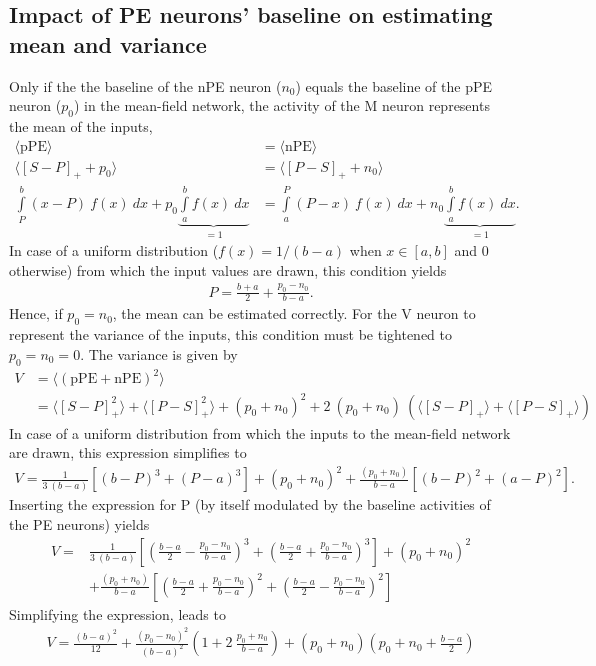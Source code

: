 \documentclass[10pt,a4paper,draft]{article}
\begin{document}
\subsection*{Impact of PE neurons' baseline on estimating mean and variance}
%
Only if the the baseline of the nPE neuron ($n_0$) equals the baseline of the pPE neuron ($p_0$) in the mean-field network, the activity of the M neuron represents the mean of the inputs,
%
\begin{align}
\label{eq:condition_baseline_mean}
\langle \mathrm{pPE} \rangle &= \langle \mathrm{nPE} \rangle \\
\langle \left[ S - P\right]_+ + p_0\rangle &= \langle \left[ P - S\right]_+ + n_0\rangle \nonumber\\
\int\limits_P^b (x - P)\ f(x)\ dx + p_0 \underbrace{\int\limits_a^b f(x)\ dx}_{=1}  &= \int\limits_a^P (P - x)\ f(x)\ dx + n_0 \underbrace{\int\limits_a^b f(x)\ dx}_{=1} . \nonumber
\end{align}
%
In case of a uniform distribution ($f(x) = 1/(b-a)$ when $x\in [a,b]$ and $0$ otherwise) from which the input values are drawn, this condition yields
%
\begin{align}
\label{eq:condition_baseline_mean_1}
P = \frac{b+a}{2} + \frac{p_0 - n_0}{b-a}.
\end{align}
%
Hence, if $p_0 = n_0$, the mean can be estimated correctly. For the V neuron to represent the variance of the inputs, this condition must be tightened to $p_0 = n_0 = 0$. The variance is given by
%
\begin{align}
\label{eq:condition_baseline_variance}
V &= \langle \left( \mathrm{pPE} + \mathrm{nPE} \right)^2 \rangle \\
&= \langle \left[ S-P\right]_+^2\rangle + \langle \left[ P-S\right]_+^2\rangle + (p_0 + n_0)^2 + 2\ (p_0 + n_0)\ \left( \langle \left[ S-P\right]_+\rangle + \langle \left[ P-S\right]_+ \rangle\right) \nonumber
\end{align}
%
In case of a uniform distribution from which the inputs to the mean-field network are drawn, this expression simplifies to
%
\begin{align}
\label{eq:condition_baseline_variance_1}
V = \frac{1}{3\ (b-a)} \left[ (b-P)^3 + (P-a)^3\right] + (p_0 + n_0)^2 + \frac{(p_0 + n_0)}{b-a} \left[ (b-P)^2 + (a-P)^2\right].
\end{align}
%
Inserting the expression for P (by itself modulated by the baseline activities of the PE neurons) yields
%
\begin{align}
V =& \frac{1}{3\ (b-a)} \left[ \left( \frac{b-a}{2} - \frac{p_0 - n_0}{b-a}\right)^3 + \left( \frac{b-a}{2} + \frac{p_0-n_0}{b-a}\right)^3\right] + (p_0 + n_0)^2 \nonumber \\
&+ \frac{(p_0 + n_0)}{b-a} \left[ \left( \frac{b-a}{2} + \frac{p_0-n_0}{b-a}\right)^2 + \left( \frac{b-a}{2} - \frac{p_0 - n_0}{b-a}\right)^2\right]
\end{align}
%
Simplifying the expression, leads to
%
\begin{align}
\label{eq:condition_baseline_variance_2}
V =  \frac{(b-a)^2}{12} + \frac{(p_0-n_0)^2}{(b-a)^2} \left( 1 + 2\ \frac{p_0+n_0}{b-a}\right) + (p_0 + n_0) \left( p_0 + n_0 + \frac{b-a}{2}\right)
\end{align}
%
\end{document}

